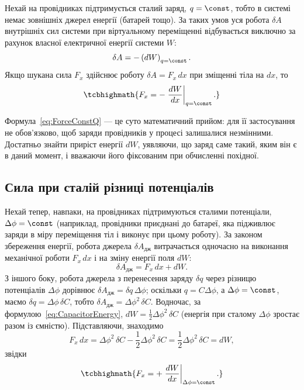 Нехай на провідниках підтримується сталий заряд, $q = \const$, тобто в системі немає зовнішніх джерел енергії (батарей тощо). За таких умов уся
робота $\delta A$ внутрішніх сил системи при віртуальному переміщенні відбувається виключно за рахунок  власної електричної
енергії системи $W$:
\begin{equation*}
	\delta A = -\left(dW\right)_{q=\const}.
\end{equation*}
Якщо шукана сила $F_x$ здійснює роботу $\delta A = F_x\, dx$ при зміщенні тіла на $dx$, то
\begin{equation}\label{eq:ForceConstQ}
	\tcbhighmath{
		F_x = -\left.\frac{dW}{dx}\right|_{q=\const}.
	}
\end{equation}

\begin{Attention}
	Формула~\eqref{eq:ForceConstQ} --- це суто математичний прийом: для її застосування не обов'язково, щоб заряди провідників у 
	процесі залишалися незмінними. Достатньо знайти приріст енергії $dW$, уявляючи, що заряд саме такий, яким він є в даний момент, і 
	вважаючи його фіксованим при обчисленні похідної.
\end{Attention}

\subsection*{Сила при сталій різниці потенціалів}

Нехай тепер, навпаки, на провідниках підтримуються сталими потенціали, $\Delta\phi = \const$ (наприклад, провідники приєднані до батареї, яка
підживлює заряди в міру переміщення тіл і виконує при цьому роботу). За законом збереження енергії, робота джерела $\delta A_\text{дж}$ витрачається
одночасно на виконання механічної роботи $F_x\, dx$ і на зміну енергії поля $dW$:
\begin{equation*}
	\delta A_\text{дж} = F_x\, dx + dW.
\end{equation*}
З іншого боку, робота джерела з перенесення заряду $\delta q$ через різницю потенціалів $\Delta\phi$ дорівнює $\delta A_\text{дж} = \delta q\,
\Delta\phi$; оскільки $q = C\Delta\phi$, а $\Delta\phi = \const$, маємо $\delta q = \Delta\phi\, \delta C$, тобто $\delta A_\text{дж} = \Delta\phi^2\,
\delta C$. Водночас, за формулою~\eqref{eq:CapacitorEnergy}, $dW = \tfrac12\Delta\phi^2\, \delta C$ (енергія при сталому $\Delta\phi$ зростає разом
із ємністю). Підставляючи, знаходимо
\begin{equation*}
	F_x\, dx = \Delta\phi^2\,\delta C - \frac12\Delta\phi^2\,\delta C = \frac12\Delta\phi^2\,\delta C = dW,
\end{equation*}
звідки
\begin{equation}\label{eq:ForceConstPhi}
	\tcbhighmath{
		F_x = +\left.\frac{dW}{dx}\right|_{\Delta\phi=\const}.
	}
\end{equation}

